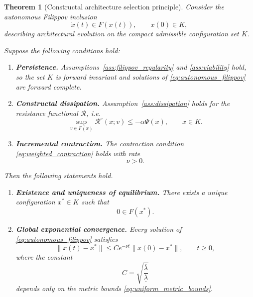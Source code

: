 \documentclass[12pt]{article}
\theoremstyle{plain}
\newtheorem{theorem}{Theorem}[section]
\theoremstyle{definition}
\theoremstyle{remark}
\begin{document}
\begin{theorem}[Constructal architecture selection principle]
\label{thm:constructal_selection}
Consider the autonomous Filippov inclusion
\begin{equation}
\dot x(t)\in F(x(t)),
\qquad x(0)\in K,
\label{eq:autonomous_filippov}
\end{equation}
describing architectural evolution on the compact admissible
configuration set $K$.

Suppose the following conditions hold:

\begin{enumerate}[label=(\roman*),leftmargin=2.2em]

\item \textbf{Persistence.}
      Assumptions~\ref{ass:filippov_regularity} and
      \ref{ass:viability} hold, so the set $K$ is forward invariant
      and solutions of \eqref{eq:autonomous_filippov} are forward
      complete.

\item \textbf{Constructal dissipation.}
      Assumption~\ref{ass:dissipation} holds for the resistance
      functional $\mathcal R$, i.e.
      \begin{equation}
      \sup_{v\in F(x)}
      \mathcal R^\circ(x;v)
      \le -\alpha\Psi(x),
      \qquad x\in K.
      \label{eq:dissipation_theorem}
      \end{equation}

\item \textbf{Incremental contraction.}
      The contraction condition
      \eqref{eq:weighted_contraction} holds with rate
      \begin{equation}
      \nu>0 .
      \label{eq:nu_selection}
      \end{equation}

\end{enumerate}

Then the following statements hold.

\begin{enumerate}[label=(\alph*),leftmargin=2.2em]

\item \textbf{Existence and uniqueness of equilibrium.}
      There exists a unique configuration $x^\ast\in K$ such that
      \begin{equation}
      0\in F(x^\ast).
      \label{eq:constructal_equilibrium}
      \end{equation}

\item \textbf{Global exponential convergence.}
      Every solution of \eqref{eq:autonomous_filippov} satisfies
      \begin{equation}
      \|x(t)-x^\ast\|
      \le
      C e^{-\nu t}
      \|x(0)-x^\ast\|,
      \qquad t\ge0,
      \label{eq:global_exponential_convergence}
      \end{equation}
      where the constant
      \begin{equation}
      C=\sqrt{\frac{\overline{\lambda}}{\underline{\lambda}}}
      \label{eq:C_definition}
      \end{equation}
      depends only on the metric bounds
      \eqref{eq:uniform_metric_bounds}.


\end{enumerate}
\end{theorem}
\end{document}
